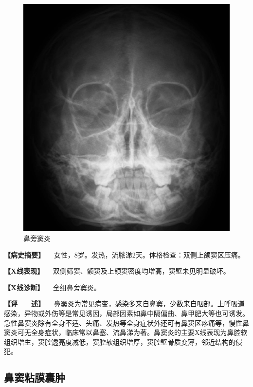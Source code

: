 \begin{figure}[!htbp]
 \centering
 \includegraphics{./images/Image00430.jpg}
 \captionsetup{justification=centering}
 \caption{鼻旁窦炎}
 \label{fig7-4-4}
  \end{figure} 

\textbf{【病史摘要】}
　女性，8岁。发热，流脓涕2天。体格检查：双侧上颌窦区压痛。

\textbf{【X线表现】}
　双侧筛窦、额窦及上颌窦密度均增高，窦壁未见明显破坏。

\textbf{【X线诊断】} 　全组鼻旁窦炎。

\textbf{【评　　述】}
　鼻窦炎为常见病变，感染多来自鼻窦，少数来自咽部。上呼吸道感染，异物或外伤等是常见诱因，局部因素如鼻中隔偏曲、鼻甲肥大等也可诱发。急性鼻窦炎除有全身不适、头痛、发热等全身症状外还可有鼻窦区疼痛等，慢性鼻窦炎可无全身症状，临床常以鼻塞、流鼻涕为著。鼻窦炎的主要X线表现为鼻腔软组织增生，窦腔透亮度减低，窦腔软组织增厚，窦腔壁骨质变薄，邻近结构的侵犯。

\subsection{鼻窦粘膜囊肿}

